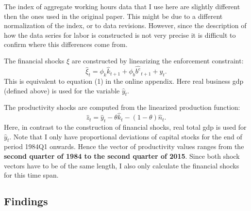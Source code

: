 The index of aggregate working hours data that I use here are slightly
different then the ones used in the original paper. This might be due to a
different normalization of the index, or to data revisions. However, since the
description of how the data series for labor is constructed is not very precise
it is difficult to confirm where this differences come from.

The financial shocks \( \xi \) are constructed by linearizing the enforcement constraint:
\begin{equation}
\label{eq:fin_shock_correct_timing}
    \hat{\xi}_t = \phi_k \hat{k}_{t+1} + \phi_b \hat{b^e}_{t+1} + \hat{y}_t.
\end{equation}
This is equivalent to equation (1) in the online appendix. Here real business
gdp (defined above) is used for the variable \(\hat{y}_t\).

The productivity shocks are computed from the linearized production function:
\begin{equation}
    \hat{z}_t = \hat{y}_t - \theta \hat{k}_t - (1 - \theta) \hat{n}_t.
\end{equation}
Here, in contrast to the construction of financial shocks, real total gdp is
used for \(\hat{y}_t\). Note that I only have proportional deviations of
capital stocks for the end of period 1984Q1 onwards. Hence the vector of
productivity values ranges from the \textbf{second quarter of 1984 to the
  second quarter of 2015}. Since both shock vectors have to be of the same
length, I also only calculate the financial shocks for this time span.


%         

\subsection{Findings}
\label{sec:findings}


\blindtext